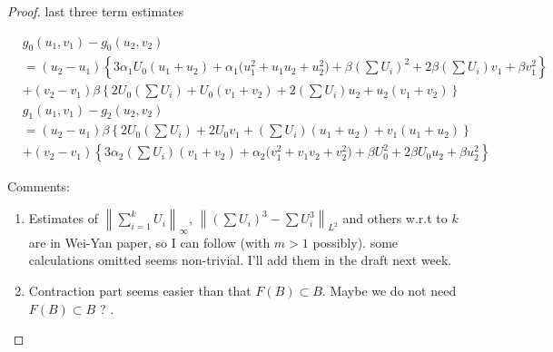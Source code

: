 \documentclass[a4paper,11pt]{article}
\def\blue{\color{blue}}
\def\blue{\color{blue}}
\numberwithin{step}{dummy}
\begin{document}
\begin{proof}

 {\blue last three term estimates}
 {\blue
\begin{align*} 
&g_0(u_1,v_1) - g_0(u_2,v_2)\\
&=(u_2 - u_1)\left\{ 3\alpha_1U_0(u_1+u_2) + \alpha_1\big(u_1^2+u_1u_2 + u_2^2\big) + \beta \left(\sum U_i\right)^2 + 2\beta \left(\sum U_i\right) v_1 + \beta v_1^2\right\}\\
&+ (v_2-v_1)\beta\left\{ 2U_0 \left(\sum U_i\right) + U_0(v_1+v_2) + 2\left( \sum U_i\right)u_2 + u_2(v_1+v_2)\right\} \\ 
&g_1(u_1,v_1) - g_2(u_2,v_2)\\
&=(u_2 - u_1)\beta\left\{ 2U_0\left(\sum U_i\right) + 2U_0v_1 + \left(\sum U_i\right)(u_1+u_2) +v_1(u_1+u_2)\right\}\\
&+ (v_2-v_1)\left\{ 3\alpha_2\left(\sum U_i\right)(v_1+v_2) + \alpha_2\big(v_1^2 + v_1v_2 + v_2^2\big) + \beta U_0^2 + 2\beta U_0u_2 + \beta u_2^2\right\}
\end{align*}


 }
\newpage
Comments:

\begin{enumerate}
\item Estimates of $\displaystyle\left\|\sum_{i=1}^k U_i\right\|_\infty$, $\left\| \left(\sum U_i\right)^3 - \sum U_i^3 \right\|_{L^2}$ and others w.r.t to $k$ are in Wei-Yan paper, so I can follow (with $m>1$ possibly). some calculations omitted seems non-trivial. I'll add them in the draft next week.

\item Contraction part seems easier than that $F(B) \subset B$.  Maybe we do not need $F(B)\subset B$ ? .

\end{enumerate}
\end{proof}
\end{document}

